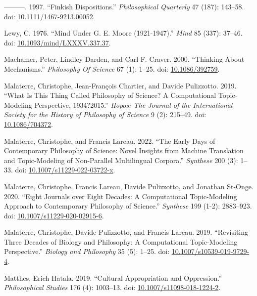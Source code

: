 \documentclass[
  10pt,
  letterpaper,
  DIV=11,
  numbers=noendperiod,
  twoside]{scrartcl}
\newlength{\cslhangindent}
\newenvironment{CSLReferences}[2] %
 {\begin{list}{}{%
  \setlength{\itemindent}{0pt}
  \setlength{\leftmargin}{0pt}
  \setlength{\parsep}{0pt}
  \ifodd #1
   \setlength{\leftmargin}{\cslhangindent}
   \setlength{\itemindent}{-1\cslhangindent}
  \fi
  \setlength{\itemsep}{#2\baselineskip}}}
 {\end{list}}
\begin{document}
\begin{CSLReferences}{1}{0}
---------. 1997. {``Finkish Dispositions.''} \emph{Philosophical
Quarterly} 47 (187): 143--58. doi:
\href{https://doi.org/10.1111/1467-9213.00052}{10.1111/1467-9213.00052}.

Lewy, C. 1976. {``Mind Under {G. E. Moore} (1921-1947).''} \emph{Mind}
85 (337): 37--46. doi:
\href{https://doi.org/10.1093/mind/LXXXV.337.37}{10.1093/mind/LXXXV.337.37}.

Machamer, Peter, Lindley Darden, and Carl F. Craver. 2000. {``Thinking
About Mechanisms.''} \emph{Philosophy Of Science} 67 (1): 1--25. doi:
\href{https://doi.org/10.1086/392759}{10.1086/392759}.

Malaterre, Christophe, Jean-François Chartier, and Davide Pulizzotto.
2019. {``What Is This Thing Called Philosophy of Science? A
Computational Topic-Modeling Perspective, 1934?2015.''} \emph{Hopos: The
Journal of the International Society for the History of Philosophy of
Science} 9 (2): 215--49. doi:
\href{https://doi.org/10.1086/704372}{10.1086/704372}.

Malaterre, Christophe, and Francis Lareau. 2022. {``The Early Days of
Contemporary Philosophy of Science: Novel Insights from Machine
Translation and Topic-Modeling of Non-Parallel Multilingual Corpora.''}
\emph{Synthese} 200 (3): 1--33. doi:
\href{https://doi.org/10.1007/s11229-022-03722-x}{10.1007/s11229-022-03722-x}.

Malaterre, Christophe, Francis Lareau, Davide Pulizzotto, and Jonathan
St-Onge. 2020. {``Eight Journals over Eight Decades: A Computational
Topic-Modeling Approach to Contemporary Philosophy of Science.''}
\emph{Synthese} 199 (1-2): 2883--923. doi:
\href{https://doi.org/10.1007/s11229-020-02915-6}{10.1007/s11229-020-02915-6}.

Malaterre, Christophe, Davide Pulizzotto, and Francis Lareau. 2019.
{``Revisiting Three Decades of Biology and Philosophy: A Computational
Topic-Modeling Perspective.''} \emph{Biology and Philosophy} 35 (5):
1--25. doi:
\href{https://doi.org/10.1007/s10539-019-9729-4}{10.1007/s10539-019-9729-4}.

Matthes, Erich Hatala. 2019. {``Cultural Appropriation and
Oppression.''} \emph{Philosophical Studies} 176 (4): 1003--13. doi:
\href{https://doi.org/10.1007/s11098-018-1224-2}{10.1007/s11098-018-1224-2}.


\end{CSLReferences}
\end{document}
